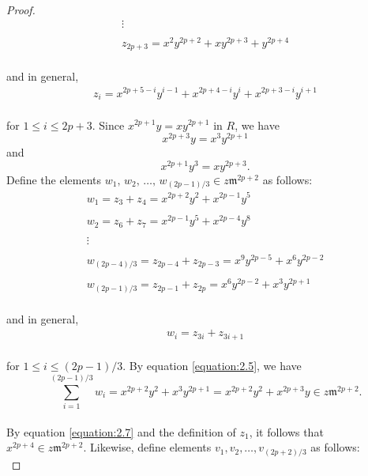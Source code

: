 \documentclass{amsart}
\theoremstyle{definition}
\theoremstyle{definition}
\numberwithin{equation}{section}
\theoremstyle{definition}
\begin{document}
{\begin{proof}
\begin{align*}
&\vdots& \\\\
&z_{2p+3}=x^2 y^{2p+2} +xy^{2p+3} + y^{2p+4}&
\end{align*} \text{}\\ and in general, 
\begin{align*}
&z_i=x^{2p+5-i}y^{i-1} + x^{2p+4-i}y^{i} + x^{2p+3-i}y^{i+1}&
\end{align*}\text{}\\ 
for $1 \leq i \leq 2p+3$. Since $x^{2p+1} y= xy^{2p+1}$ in $R$, we have \\ 
\begin{equation}\label{equation:2.5}
x^{2p+3}y=x^3y^{2p+1}
\end{equation} and 
\begin{equation}\label{equation:2.6}
x^{2p+1}y^3 = xy^{2p+3}.
\end{equation} \text{} Define the elements $w_1, \, w_2, \, \dots, \, w_{(2p-1)/3} \in z\mathfrak{m}^{2p+2}$ as follows:\text{}\\
\begin{align*}
&w_1 = z_3 + z_4 = x^{2p+2}y^2 + x^{2p-1}y^5&\\\\
&w_2 = z_6 +z _7 = x^{2p-1}y^5 + x^{2p-4}y^{8}&\\\\
&\vdots& \\\\
&w_{(2p-4)/3}=z_{2p-4} + z_{2p-3} = x^9 y^{2p-5} + x^6 y^{2p-2}&
\\\\
&w_{(2p-1)/3}= z_{2p-1} + z_{2p} = x^6 y^{2p-2} + x^3 y^{2p+1}&
\end{align*} \text{}\\ and in general, 
\begin{align*}
&w_i = z_{3i} + z_{3i+1}&
\end{align*}
\text{}\\ for $1 \leq i \leq (2p-1)/3$. By equation \ref{equation:2.5}, we have \\
\begin{equation}\label{equation:2.7}
\sum\limits_{i=1}^{(2p-1)/3} w_{i} = x^{2p+2}y^2 + x^3y^{2p+1} = x^{2p+2}y^2 + x^{2p+3}y \in z \mathfrak{m}^{2p+2}.
\end{equation} \text{}\\ By equation \ref{equation:2.7} and the definition of $z_1$, it follows that $x^{2p+4} \in z \mathfrak{m}^{2p+2}$. Likewise, define elements $v_1, v_2, \dots, v_{(2p+2)/3}$ as follows: \\

\end{proof}}
\end{document}

